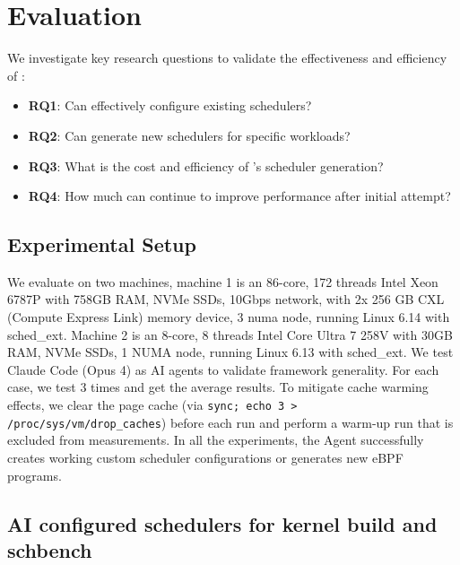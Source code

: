 \section{Evaluation}
\label{sec:evaluation}


We investigate key research questions to validate the effectiveness and efficiency of \sys:

\begin{itemize}
\item \textbf{RQ1}: Can \sys effectively configure existing schedulers?
\item \textbf{RQ2}: Can \sys generate new schedulers for specific workloads?
\item \textbf{RQ3}: What is the cost and efficiency of \sys's scheduler generation?
\item \textbf{RQ4}: How much can \agent continue to improve performance after initial attempt?
\end{itemize}

\subsection{Experimental Setup}

We evaluate \sys on two machines, machine 1 is an 86-core, 172 threads Intel Xeon 6787P with 758GB RAM, NVMe SSDs, 10Gbps network, with 2x 256 GB CXL (Compute Express Link) memory device, 3 numa node, running Linux 6.14 with sched\_ext. Machine 2 is an 8-core, 8 threads Intel Core Ultra 7 258V with 30GB RAM, NVMe SSDs, 1 NUMA node, running Linux 6.13 with sched\_ext. We test Claude Code (Opus 4) as AI agents to validate framework generality. For each case, we test 3 times and get the average results. To mitigate cache warming effects, we clear the page cache (via \texttt{sync; echo 3 > /proc/sys/vm/drop\_caches}) before each run and perform a warm-up run that is excluded from measurements. In all the experiments, the Agent successfully creates working custom scheduler configurations or generates new eBPF programs.

\subsection{AI configured schedulers for kernel build and schbench}

